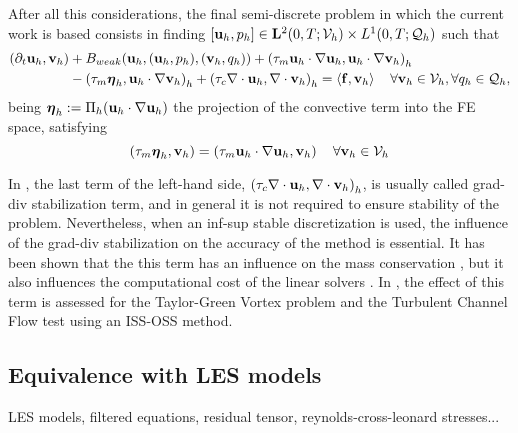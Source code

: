 After all this considerations, the final semi-discrete problem in which the current work is based consists in finding 
$[{\bf u}_h,p_h]\in\mathbf{L}^2(0,T;\mathcal{V}_{h})\times L^1(0,T;\mathcal{Q}_{h})$ such that
\begin{align}
\label{eq-C7_NS_vms_mfe_oss}
(\partial_t{\bf u}_h,{\bf v}_h)&+B_{weak}({\bf u}_h,({\bf u}_h,p_h),({\bf v}_h,q_h))+\left(\tau_m{\bf u}_h\cdot\nabla{\bf u}_h,{\bf u}_h\cdot\nabla{\bf v}_h\right)_h\\\nonumber
&-\left(\tau_m\boldsymbol{\eta}_h,{\bf u}_h\cdot\nabla{\bf v}_h\right)_h+\left(\tau_c\nabla\cdot{\bf u}_h,\nabla\cdot{\bf v}_h\right)_h=\left<{\bf f},{\bf v}_h\right>
\quad\forall{\bf v}_h\in\mathcal{V}_{h},\forall q_h\in\mathcal{Q}_{h},
\end{align}
being $ \boldsymbol{\eta}_h:=\Pi_h({\bf u}_h\cdot\nabla{\bf u}_h) $ the projection of the convective term into the FE space, satisfying
\begin{equation}
\label{eq-C7_NS_projection}
\left(\tau_m\boldsymbol{\eta}_h,{\bf v}_h\right)=\left(\tau_m{\bf u}_h\cdot\nabla{\bf u}_h,{\bf v}_h\right)\quad\forall{\bf v}_h\in\mathcal{V}_{h}
\end{equation}

In , the last term of the left-hand side, $ \left(\tau_c\nabla\cdot{\bf u}_h,\nabla\cdot{\bf v}_h\right)_h $, is usually called grad-div stabilization term, and in general it is not required to ensure stability of the problem. Nevertheless, when an inf-sup stable discretization is used, the influence of the grad-div stabilization on the accuracy of the method is essential. It has been shown that the this term has an influence on the mass conservation \cite{linke_collision_2009}, but it also influences the computational cost of the linear solvers \cite{olshanskii_grad-div_2004,heister_efficient_2013}. In \cite{colomes_mixed}, the effect of this term is assessed for the Taylor-Green Vortex problem and the Turbulent Channel Flow test using an ISS-OSS method.

\subsection{Equivalence with LES models}
\label{subsec-C7_tbt_OSS_ISS}
LES models, filtered equations, residual tensor, reynolds-cross-leonard stresses...

